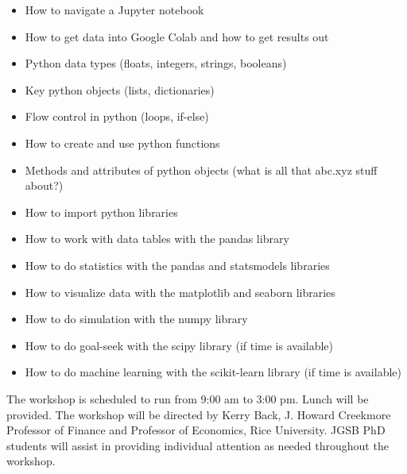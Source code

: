 \documentclass[11pt]{scrartcl}
\begin{document}
\begin{itemize}[itemsep=0ex]
\item How to navigate a Jupyter notebook
\item How to get data into Google Colab and how to get results out
\item Python data types (floats, integers, strings, booleans)
\item Key python objects (lists, dictionaries)
\item Flow control in python (loops, if-else)
\item How to create and use python functions
\item Methods and attributes of python objects (what is all that abc.xyz stuff about?)
\item How to import python libraries
\item How to work with data tables with the pandas library
\item How to do statistics with the pandas and statsmodels libraries
\item How to visualize data with the matplotlib and seaborn libraries
\item How to do simulation with the numpy library
\item How to do goal-seek with the scipy library (if time is available)
\item How to do machine learning with the scikit-learn library (if time is available)
\end{itemize}

The workshop is scheduled to run from 9:00 am to 3:00 pm.  Lunch will be provided.  The workshop will be directed by Kerry Back, J. Howard Creekmore Professor of Finance and Professor of Economics, Rice University.    JGSB PhD students will assist in providing individual attention as needed throughout the workshop.
\end{document}
